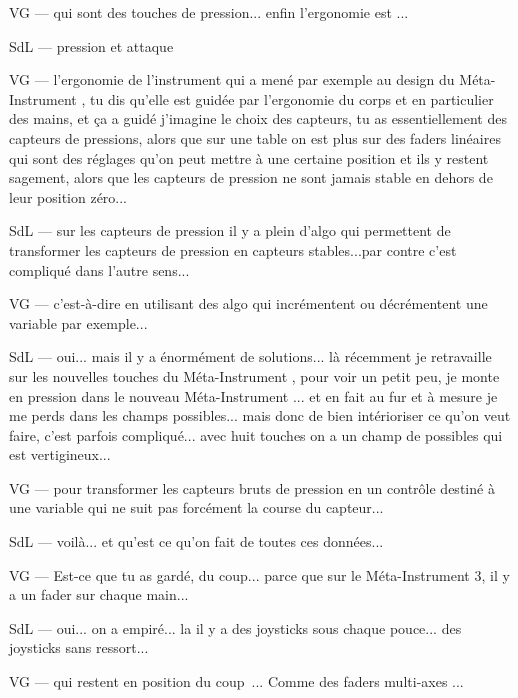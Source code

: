 VG — qui sont des touches de pression... enfin l'ergonomie est ... 

SdL — pression et attaque 

VG — l'ergonomie de l'instrument qui a mené par exemple au design du Méta-Instrument , tu dis qu'elle est guidée par l'ergonomie du corps et en particulier des mains, et ça a guidé j'imagine le choix des capteurs, tu as essentiellement des capteurs de pressions, alors que sur une table on est plus sur des faders linéaires qui sont des réglages qu'on peut mettre à une certaine position et ils y restent sagement, alors que les capteurs de pression ne sont jamais stable en dehors de leur position zéro... 

SdL — sur les capteurs de pression il y a plein d'algo qui permettent de transformer les capteurs de pression en capteurs stables...par contre c'est compliqué dans l'autre sens... 

VG — c'est-à-dire en utilisant des algo qui incrémentent ou décrémentent une variable par exemple... 

SdL — oui... mais il y a énormément de solutions... là récemment je retravaille sur les nouvelles touches du Méta-Instrument , pour voir un petit peu, je monte en pression dans le nouveau Méta-Instrument ... et en fait au fur et à mesure je me perds dans les champs possibles... mais donc de bien intérioriser ce qu'on veut faire, c'est parfois compliqué... avec huit touches on a un champ de possibles qui est vertigineux... 

VG — pour transformer les capteurs bruts de pression en un contrôle destiné à une variable qui ne suit pas forcément la course du capteur... 

SdL — voilà... et qu'est ce qu'on fait de toutes ces données... 

VG — Est-ce que tu as gardé, du coup... parce que sur le Méta-Instrument 3, il y a un fader sur chaque main... 

SdL — oui... on a empiré... la il y a des joysticks sous chaque pouce... des joysticks sans ressort... 

VG — qui restent en position du coup ... Comme des faders multi-axes ... 

